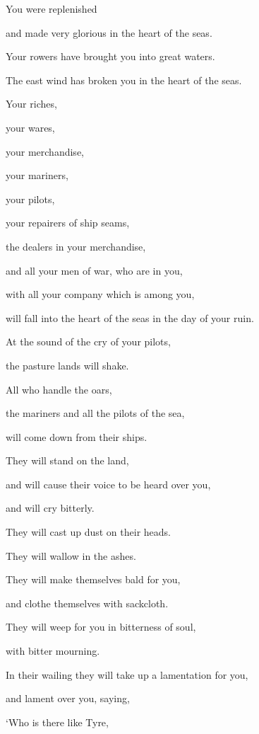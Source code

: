 {\par }{\QB You were replenished
\par }{\QB and made very glorious in the heart of the seas.
\par }{\Q {}Your rowers have brought you into great waters.
\par }{\QB The east wind has broken you in the heart of the seas.
\par }{\Q {}Your riches,
\par }{\QB your wares,
\par }{\QB your merchandise,
\par }{\Q your mariners,
\par }{\QB your pilots,
\par }{\QB your repairers of ship seams,
\par }{\Q the dealers in your merchandise,
\par }{\QB and all your men of war, who are in you,
\par }{\Q with all your company which is among you,
\par }{\QB will fall into the heart of the seas in the day of your ruin.
\par }{\Q {}At the sound of the cry of your pilots,
\par }{\QB the pasture lands will shake.
\par }{\Q {}All who handle the oars,
\par }{\QB the mariners and all the pilots of the sea,
\par }{\QB will come down from their ships.
\par }{\Q They will stand on the land,
\par }{\QB {}and will cause their voice to be heard over you,
\par }{\QB and will cry bitterly.
\par }{\Q They will cast up dust on their heads.
\par }{\QB They will wallow in the ashes.
\par }{\Q {}They will make themselves bald for you,
\par }{\QB and clothe themselves with sackcloth.
\par }{\Q They will weep for you in bitterness of soul,
\par }{\QB with bitter mourning.
\par }{\Q {}In their wailing they will take up a lamentation for you,
\par }{\QB and lament over you, saying,
\par }{\Q ‘Who is there like Tyre,
}

